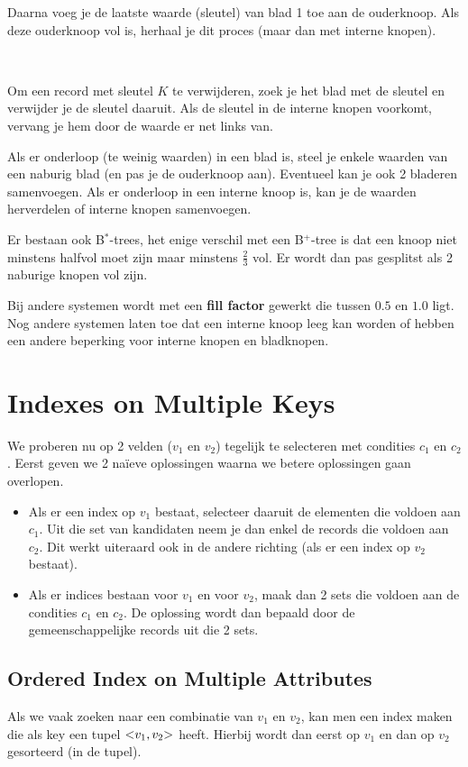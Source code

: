 Daarna voeg je de laatste waarde (sleutel) van blad 1 toe aan de ouderknoop. Als deze ouderknoop vol is, herhaal je dit proces (maar dan met interne knopen).

~

\noindent Om een record met sleutel $K$ te verwijderen, zoek je het blad met de sleutel en verwijder je de sleutel daaruit. Als de sleutel in de interne knopen voorkomt, vervang je hem door de waarde er net links van.

Als er onderloop (te weinig waarden) in een blad is, steel je enkele waarden van een naburig blad (en pas je de ouderknoop aan). Eventueel kan je ook 2 bladeren samenvoegen. Als er onderloop in een interne knoop is, kan je de waarden herverdelen of interne knopen samenvoegen.

\newpage
\noindent Er bestaan ook B$^*$-trees, het enige verschil met een B$^+$-tree is dat een knoop niet minstens halfvol moet zijn maar minstens $\frac{2}{3}$ vol. Er wordt dan pas gesplitst als 2 naburige knopen vol zijn.

Bij andere systemen wordt met een \textbf{fill factor} gewerkt die tussen $0.5$ en $1.0$ ligt. Nog andere systemen laten toe dat een interne knoop leeg kan worden of hebben een andere beperking voor interne knopen en bladknopen.



\section{Indexes on Multiple Keys}
We proberen nu op 2 velden ($v_1$ en $v_2$) tegelijk te selecteren met condities $c_1$ en $c_2$. Eerst geven we 2 na\"ieve oplossingen waarna we betere oplossingen gaan overlopen.
\begin{itemize}
	\item Als er een index op $v_1$ bestaat, selecteer daaruit de elementen die voldoen aan $c_1$. Uit die set van kandidaten neem je dan enkel de records die voldoen aan $c_2$. Dit werkt uiteraard ook in de andere richting (als er een index op $v_2$ bestaat).
	\item Als er indices bestaan voor $v_1$ en voor $v_2$, maak dan 2 sets die voldoen aan de condities $c_1$ en $c_2$. De oplossing wordt dan bepaald door de gemeenschappelijke records uit die 2 sets.
\end{itemize}


\subsection{Ordered Index on Multiple Attributes}
Als we vaak zoeken naar een combinatie van $v_1$ en $v_2$, kan men een index maken die als key een tupel $\text{\textless} v_1, v_2 \text{\textgreater}$ heeft. Hierbij wordt dan eerst op $v_1$ en dan op $v_2$ gesorteerd (in de tupel). 


